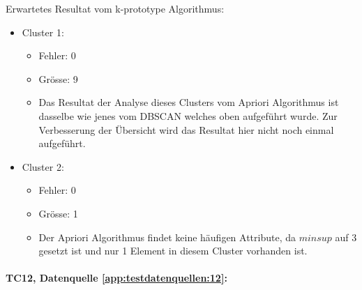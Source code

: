 Erwartetes Resultat vom k-prototype Algorithmus:
\begin{itemize}
	\item Cluster 1:
	\begin{itemize}
		\item Fehler: 0
		\item Grösse: 9
		\item Das Resultat der Analyse dieses Clusters vom Apriori Algorithmus ist dasselbe wie jenes vom DBSCAN welches oben aufgeführt wurde. Zur Verbesserung der Übersicht wird das Resultat hier nicht noch einmal aufgeführt.
	\end{itemize}

	\item Cluster 2:
	\begin{itemize}
		\item Fehler: 0
		\item Grösse: 1
		\item Der Apriori Algorithmus findet keine häufigen Attribute, da $minsup$ auf 3 gesetzt ist und nur 1 Element in diesem Cluster vorhanden ist.
	\end{itemize}
\end{itemize}


\paragraph{TC12, Datenquelle \cref{app:testdatenquellen:12}:}\todo{}